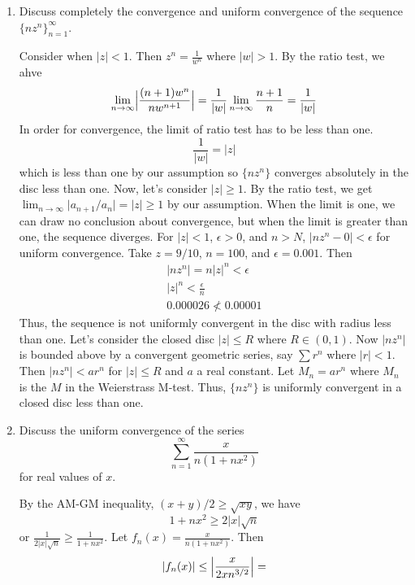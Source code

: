 \begin{enumerate}
\item
  Discuss completely the convergence and uniform convergence of the sequence
  \(\{nz^n\}_{n = 1}^{\infty}\).
  \par\smallskip
  Consider when \(\lvert z\rvert < 1\).
  Then \(z^n = \frac{1}{w^n}\) where \(\lvert w\rvert > 1\).
  By the ratio test, we ahve
  \[
  \lim_{n\to\infty}\Bigl\lvert\frac{(n + 1)w^n}{nw^{n + 1}}\Bigr\rvert =
  \frac{1}{\lvert w\rvert}\lim_{n\to\infty}\frac{n + 1}{n} =
  \frac{1}{\lvert w\rvert}
  \]
  In order for convergence, the limit of ratio test has to be less than one.
  \[
  \frac{1}{\lvert w\rvert} = \lvert z\rvert
  \]
  which is less than one by our assumption so \(\{nz^n\}\) converges
  absolutely in the disc less than one.
  Now, let's consider \(\lvert z\rvert\geq 1\).
  By the ratio test, we get
  \(\lim_{n\to\infty}\lvert a_{n + 1}/a_n\rvert = \lvert z\rvert\geq 1\) by our
  assumption.
  When the limit is one, we can draw no conclusion about convergence, but when
  the limit is greater than one, the sequence diverges.
  For \(\lvert z\rvert < 1\), \(\epsilon > 0\), and \(n > N\),
  \(\lvert nz^n - 0\rvert < \epsilon\) for uniform convergence.
  Take \(z = 9/10\), \(n = 100\), and \(\epsilon = 0.001\).
  Then
  \begin{gather*}
    \lvert nz^n\rvert = n\lvert z\rvert^n < \epsilon\\
    \lvert z\rvert^n < \frac{\epsilon}{n}\\
    0.000026 \not < 0.00001
  \end{gather*}
  Thus, the sequence is not uniformly convergent in the disc with radius less
  than one.
  Let's consider the closed disc \(\lvert z\rvert\leq R\) where \(R\in(0,1)\).
  Now \(\lvert nz^n\rvert\) is bounded above by a convergent geometric series,
  say \(\sum r^n\) where \(\lvert r\rvert < 1\).
  Then \(\lvert nz^n\rvert < ar^n\) for \(\lvert z\rvert\leq R\) and \(a\) a
  real constant.
  Let \(M_n = ar^n\) where \(M_n\) is the \(M\) in the Weierstrass M-test.
  Thus, \(\{nz^n\}\) is uniformly convergent in a closed disc less than one.
\item
  Discuss the uniform convergence of the series
  \[
  \sum_{n = 1}^{\infty}\frac{x}{n(1 + nx^2)}
  \]
  for real values of \(x\).
  \par\smallskip
  By the AM-GM inequality, \((x + y)/2\geq \sqrt{xy}\), we have
  \[
  1 + nx^2\geq 2\lvert x\rvert\sqrt{n}
  \]
  or \(\frac{1}{2\lvert x\rvert\sqrt{n}}\geq\frac{1}{1 + nx^2}\).
  Let \(f_n(x) = \frac{x}{n(1 + nx^2)}\).
  Then
  \[
  \lvert f_n(x)\rvert\leq \Bigl\lvert\frac{x}{2xn^{3/2}}\Bigr\rvert =
\]
\end{enumerate}
